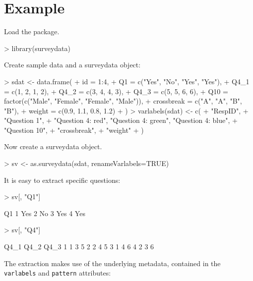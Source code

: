 \documentclass[a4paper]{article}
\begin{document}
\section{Example}

Load the package.

\begin{Schunk}
\begin{Sinput}
> library(surveydata)
\end{Sinput}
\end{Schunk}

Create sample data and a surveydata object:

\begin{Schunk}
\begin{Sinput}
> sdat <- data.frame(
+     id   = 1:4,
+     Q1   = c("Yes", "No", "Yes", "Yes"),
+     Q4_1 = c(1, 2, 1, 2), 
+     Q4_2 = c(3, 4, 4, 3), 
+     Q4_3 = c(5, 5, 6, 6), 
+     Q10 = factor(c("Male", "Female", "Female", "Male")),
+     crossbreak  = c("A", "A", "B", "B"), 
+     weight      = c(0.9, 1.1, 0.8, 1.2)
+ )
> varlabels(sdat) <- c(
+     "RespID",
+     "Question 1", 
+     "Question 4: red", "Question 4: green", "Question 4: blue", 
+     "Question 10",
+     "crossbreak",
+     "weight"
+   )
\end{Sinput}
\end{Schunk}


Now create a surveydata object.

\begin{Schunk}
\begin{Sinput}
> sv <- as.surveydata(sdat, renameVarlabels=TRUE)
\end{Sinput}
\end{Schunk}

It is easy to extract specific questions:

\begin{Schunk}
\begin{Sinput}
> sv[, "Q1"]
\end{Sinput}
\begin{Soutput}
   Q1
1 Yes
2  No
3 Yes
4 Yes
\end{Soutput}
\begin{Sinput}
> sv[, "Q4"]
\end{Sinput}
\begin{Soutput}
  Q4_1 Q4_2 Q4_3
1    1    3    5
2    2    4    5
3    1    4    6
4    2    3    6
\end{Soutput}
\end{Schunk}

The extraction makes use of the underlying metadata, contained in the \texttt{varlabels} and \texttt{pattern} attributes:
\end{document}
